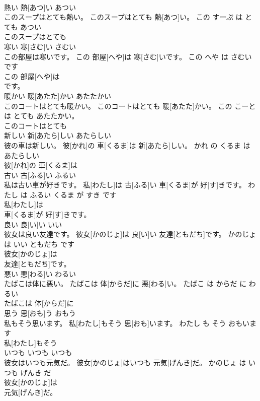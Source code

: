 \documentclass[8pt]{extreport}
\begin{document}
\begin{CJK}{UTF8}{min}
\\	熱い	熱[あつ]い	あつい	
\\	このスープはとても熱い。	このスープはとても 熱[あつ]い。	この すーぷ は とても あつい	
\\	このスープはとても
\\	寒い	寒[さむ]い	さむい	
\\	この部屋は寒いです。	この 部屋[へや]は 寒[さむ]いです。	この へや は さむい です	
\\	この 部屋[へや]は
\\	です。		
\\	暖かい	暖[あたた]かい	あたたかい	
\\	このコートはとても暖かい。	このコートはとても 暖[あたた]かい。	この こーと は とても あたたかい。	
\\	このコートはとても
\\	新しい	新[あたら]しい	あたらしい	
\\	彼の車は新しい。	彼[かれ]の 車[くるま]は 新[あたら]しい。	かれ の くるま は あたらしい	
\\	彼[かれ]の 車[くるま]は
\\	古い	古[ふる]い	ふるい	
\\	私は古い車が好きです。	私[わたし]は 古[ふる]い 車[くるま]が 好[す]きです。	わたし は ふるい くるま が すき です	
\\	私[わたし]は
\\	車[くるま]が 好[す]きです。		
\\	良い	良[い]い	いい	
\\	彼女は良い友達です。	彼女[かのじょ]は 良[い]い 友達[ともだち]です。	かのじょ は いい ともだち です	
\\	彼女[かのじょ]は
\\	友達[ともだち]です。		
\\	悪い	悪[わる]い	わるい	
\\	たばこは体に悪い。	たばこは 体[からだ]に 悪[わる]い。	たばこ は からだ に わるい	
\\	たばこは 体[からだ]に
\\	思う	思[おも]う	おもう	
\\	私もそう思います。	私[わたし]もそう 思[おも]います。	わたし も そう おもいます	
\\	私[わたし]もそう
\\	いつも	いつも	いつも	
\\	彼女はいつも元気だ。	彼女[かのじょ]はいつも 元気[げんき]だ。	かのじょ は いつも げんき だ	
\\	彼女[かのじょ]は
\\	元気[げんき]だ。		

\end{CJK}
\end{document}
